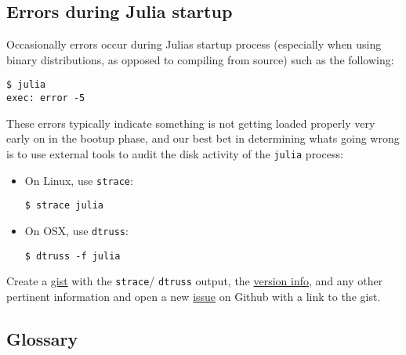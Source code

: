 \hypertarget{8599391806074935874}{}


\subsection{Errors during Julia startup}



Occasionally errors occur during Julia{\textquotesingle}s startup process (especially when using binary distributions, as opposed to compiling from source) such as the following:




\begin{verbatim}
$ julia
exec: error -5
\end{verbatim}



These errors typically indicate something is not getting loaded properly very early on in the bootup phase, and our best bet in determining what{\textquotesingle}s going wrong is to use external tools to audit the disk activity of the \texttt{julia} process:



\begin{itemize}
\item On Linux, use \texttt{strace}:


\begin{lstlisting}
$ strace julia
\end{lstlisting}


\item On OSX, use \texttt{dtruss}:


\begin{lstlisting}
$ dtruss -f julia
\end{lstlisting}

\end{itemize}


Create a \href{https://gist.github.com}{gist} with the \texttt{strace}/ \texttt{dtruss} output, the \hyperlink{4601189142062189569}{version info}, and any other pertinent information and open a new \href{https://github.com/JuliaLang/julia/issues?q=is\%3Aopen}{issue} on Github with a link to the gist.



\hypertarget{15861385441225766089}{}


\subsection{Glossary}



